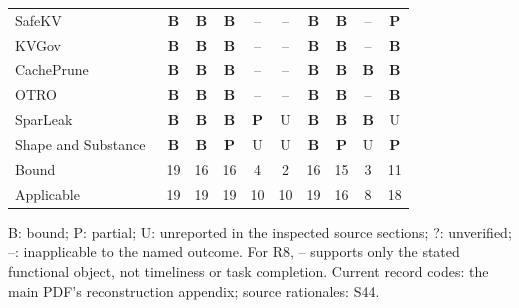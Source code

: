 \begin{table}[t]
\begin{tabularx}{\columnwidth}{@{}Y*{9}{c}@{}}
SafeKV~\cite{chu2025safekv} & \textbf{B} & \textbf{B} & \textbf{B} & -- & -- & \textbf{B} & \textbf{B} & -- & \textbf{P}\\
KVGov~\cite{addagada2026kvgov} & \textbf{B} & \textbf{B} & \textbf{B} & -- & -- & \textbf{B} & \textbf{B} & -- & \textbf{B}\\
CachePrune~\cite{wu2026cacheprune} & \textbf{B} & \textbf{B} & \textbf{B} & -- & -- & \textbf{B} & \textbf{B} & \textbf{B} & \textbf{B}\\
OTRO~\cite{lee2026otro} & \textbf{B} & \textbf{B} & \textbf{B} & -- & -- & \textbf{B} & \textbf{B} & -- & \textbf{B}\\
SparLeak~\cite{chen2026sparleak} & \textbf{B} & \textbf{B} & \textbf{B} & \textbf{P} & U & \textbf{B} & \textbf{B} & \textbf{B} & U\\
Shape and Substance~\cite{hadad2026shape} & \textbf{B} & \textbf{B} & \textbf{P} & U & U & \textbf{B} & \textbf{P} & U & \textbf{P}\\
\midrule Bound & 19 & 16 & 16 & 4 & 2 & 16 & 15 & 3 & 11\\
Applicable & 19 & 19 & 19 & 10 & 10 & 19 & 16 & 8 & 18\\
\bottomrule\end{tabularx}
\par\smallskip\raggedright B: bound; P: partial; U: unreported in the inspected source sections; ?: unverified; --: inapplicable to the named outcome. For R8, -- supports only the stated functional object, not timeliness or task completion. Current record codes: the main PDF's reconstruction appendix; source rationales: S44.
\end{table}
